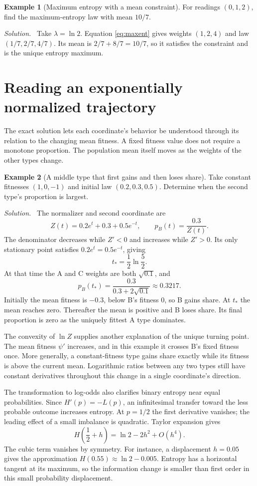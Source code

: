 \documentclass[11pt,oneside,openany]{book}
\theoremstyle{definition}
\newtheorem{example}{Example}[chapter]
\theoremstyle{remark}
\newenvironment{solution}{\par\smallskip\noindent\textit{Solution.}\ }{\par\smallskip}
\numberwithin{equation}{chapter}
\begin{document}
\begin{example}[Maximum entropy with a mean constraint]
For readings $(0,1,2)$, find the maximum-entropy law with mean $10/7$.
\begin{solution}
Take $\lambda=\ln2$. Equation \eqref{eq:maxent} gives weights $(1,2,4)$ and law $(1/7,2/7,4/7)$. Its mean is $2/7+8/7=10/7$, so it satisfies the constraint and is the unique entropy maximum.
\end{solution}
\end{example}

\section{Reading an exponentially normalized trajectory}
The exact solution lets each coordinate's behavior be understood through its relation to the changing mean fitness. A fixed fitness value does not require a monotone proportion. The population mean itself moves as the weights of the other types change.

\begin{example}[A middle type that first gains and then loses share]
Take constant fitnesses $(1,0,-1)$ and initial law $(0.2,0.3,0.5)$. Determine when the second type's proportion is largest.
\begin{solution}
The normalizer and second coordinate are
\[
Z(t)=0.2e^t+0.3+0.5e^{-t},\qquad p_B(t)=\frac{0.3}{Z(t)}.
\]
The denominator decreases while $Z'<0$ and increases while $Z'>0$. Its only stationary point satisfies $0.2e^t=0.5e^{-t}$, giving
\[
t_* =\frac12\ln\frac52.
\]
At that time the A and C weights are both $\sqrt{0.1}$, and
\[
p_B(t_*)=\frac{0.3}{0.3+2\sqrt{0.1}}\approx0.3217.
\]
Initially the mean fitness is $-0.3$, below B's fitness 0, so B gains share. At $t_*$ the mean reaches zero. Thereafter the mean is positive and B loses share. Its final proportion is zero as the uniquely fittest A type dominates.
\end{solution}
\end{example}

The convexity of $\ln Z$ supplies another explanation of the unique turning point. The mean fitness $\psi'$ increases, and in this example it crosses B's fixed fitness once. More generally, a constant-fitness type gains share exactly while its fitness is above the current mean. Logarithmic ratios between any two types still have constant derivatives throughout this change in a single coordinate's direction.

The transformation to log-odds also clarifies binary entropy near equal probabilities. Since $H'(p)=-L(p)$, an infinitesimal transfer toward the less probable outcome increases entropy. At $p=1/2$ the first derivative vanishes; the leading effect of a small imbalance is quadratic. Taylor expansion gives
\[
H\left(\frac12+h\right)=\ln2-2h^2+O(h^4).
\]
The cubic term vanishes by symmetry. For instance, a displacement $h=0.05$ gives the approximation $H(0.55)\approx\ln2-0.005$. Entropy has a horizontal tangent at its maximum, so the information change is smaller than first order in this small probability displacement.
\end{document}
